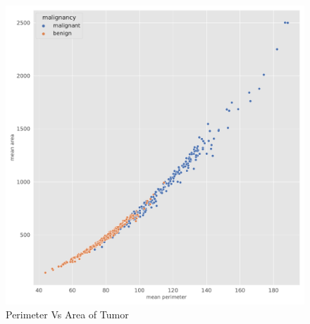 \documentclass[a4paper,12pt]{article}
\begin{document}
\begin{figure}[H]
  \centering
  \includegraphics[scale = 0.5]{Task5/perimeterVArea.pdf}
  \caption{Perimeter Vs Area of Tumor}
  \label{fig:perimVArea}
\end{figure}
\end{document}

